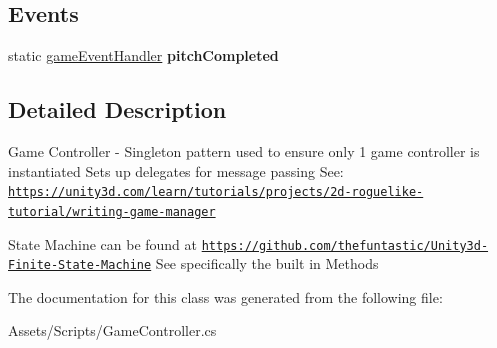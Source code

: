\subsection*{Events}
\begin{DoxyCompactItemize}
\item 
static \hyperlink{class_game_controller_a5729636ec46fe598b2ee7515df81b216}{game\+Event\+Handler} {\bfseries pitch\+Completed}\hypertarget{class_game_controller_a6c759ee8a1fc2ba9389eb8536313906e}{}\label{class_game_controller_a6c759ee8a1fc2ba9389eb8536313906e}

\end{DoxyCompactItemize}


\subsection{Detailed Description}
Game Controller -\/ Singleton pattern used to ensure only 1 game controller is instantiated Sets up delegates for message passing See\+: \href{https://unity3d.com/learn/tutorials/projects/2d-roguelike-tutorial/writing-game-manager}{\tt https\+://unity3d.\+com/learn/tutorials/projects/2d-\/roguelike-\/tutorial/writing-\/game-\/manager} 

State Machine can be found at \href{https://github.com/thefuntastic/Unity3d-Finite-State-Machine}{\tt https\+://github.\+com/thefuntastic/\+Unity3d-\/\+Finite-\/\+State-\/\+Machine} See specifically the built in Methods 

The documentation for this class was generated from the following file\+:\begin{DoxyCompactItemize}
\item 
Assets/\+Scripts/Game\+Controller.\+cs\end{DoxyCompactItemize}
